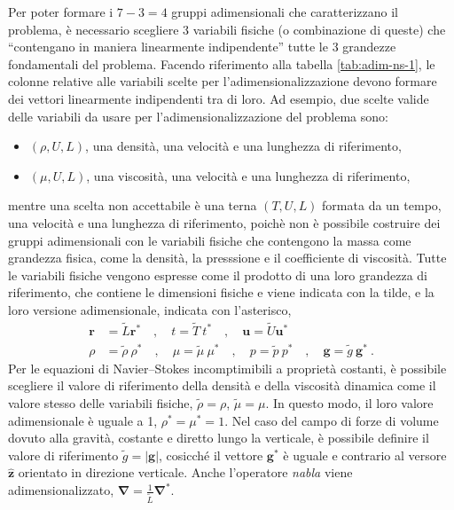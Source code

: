 Per poter formare i $7-3 = 4$ gruppi adimensionali che caratterizzano il problema, è necessario scegliere 3 variabili fisiche (o combinazione di queste) che ``contengano in maniera linearmente indipendente'' tutte le 3 grandezze fondamentali del problema. Facendo riferimento alla tabella \ref{tab:adim-ns-1}, le colonne relative alle variabili scelte per l'adimensionalizzazione devono formare dei vettori linearmente indipendenti tra di loro. Ad esempio, due scelte valide delle variabili da usare per l'adimensionalizzazione del problema sono:
\begin{itemize}
 \item $(\rho,U,L)$, una densità, una velocità e una lunghezza di riferimento,
 \item $(\mu,U,L)$, una viscosità, una velocità e una lunghezza di riferimento,
\end{itemize}
mentre una scelta non accettabile è una terna $(T,U,L)$ formata da un tempo, una velocità e una lunghezza di riferimento, poichè non è possibile costruire dei gruppi adimensionali con le variabili fisiche che contengono la massa come grandezza fisica, come la densità, la presssione e il coefficiente di viscosità.
\newline
Tutte le variabili fisiche vengono espresse come il prodotto di una loro grandezza di riferimento, che contiene le dimensioni fisiche e viene indicata con la tilde, e la loro versione adimensionale, indicata con l'asterisco,
\begin{equation}
\begin{aligned}
\bm{r} & = \tilde{L} \bm{r}^* \quad , \quad t = \tilde{T}\ t^* \quad , \quad \bm{u} = \tilde{U} \bm{u}^* \\
\rho & = \tilde{\rho} \ \rho^* \quad , \quad \mu = \tilde{\mu} \ \mu^* \quad , \quad 
p = \tilde{p} \ p^* \quad , \quad \bm{g} = \tilde{g} \ \bm{g}^* \ .
\end{aligned}
\end{equation}
Per le equazioni di Navier--Stokes incomptimibili a proprietà costanti, è possibile scegliere il valore di riferimento della densità e della viscosità dinamica come il valore stesso delle variabili fisiche, $\tilde{\rho} = \rho$, $\tilde{\mu} = \mu$. In questo modo, il loro valore adimensionale è uguale a 1, $\rho^* = \mu^* = 1$. Nel caso del campo di forze di volume dovuto alla gravità, costante e diretto lungo la verticale, è possibile definire il valore di riferimento $\tilde{g} = |\bm{g}|$, cosicché il vettore $\bm{g}^*$ è uguale e contrario al versore $\bm{\hat{z}}$ orientato in direzione verticale. Anche l'operatore \textit{nabla} viene adimensionalizzato, $\bm{\nabla} = \frac{1}{\tilde{L}} \bm{\nabla}^*$.
